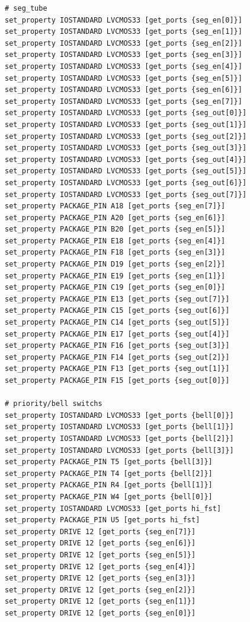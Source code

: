 \documentclass[onecolumn, oneside, ctexart]{SUSTechHomework}
\begin{document}
\begin{lstlisting}
# seg_tube
set_property IOSTANDARD LVCMOS33 [get_ports {seg_en[0]}]
set_property IOSTANDARD LVCMOS33 [get_ports {seg_en[1]}]
set_property IOSTANDARD LVCMOS33 [get_ports {seg_en[2]}]
set_property IOSTANDARD LVCMOS33 [get_ports {seg_en[3]}]
set_property IOSTANDARD LVCMOS33 [get_ports {seg_en[4]}]
set_property IOSTANDARD LVCMOS33 [get_ports {seg_en[5]}]
set_property IOSTANDARD LVCMOS33 [get_ports {seg_en[6]}]
set_property IOSTANDARD LVCMOS33 [get_ports {seg_en[7]}]
set_property IOSTANDARD LVCMOS33 [get_ports {seg_out[0]}]
set_property IOSTANDARD LVCMOS33 [get_ports {seg_out[1]}]
set_property IOSTANDARD LVCMOS33 [get_ports {seg_out[2]}]
set_property IOSTANDARD LVCMOS33 [get_ports {seg_out[3]}]
set_property IOSTANDARD LVCMOS33 [get_ports {seg_out[4]}]
set_property IOSTANDARD LVCMOS33 [get_ports {seg_out[5]}]
set_property IOSTANDARD LVCMOS33 [get_ports {seg_out[6]}]
set_property IOSTANDARD LVCMOS33 [get_ports {seg_out[7]}]
set_property PACKAGE_PIN A18 [get_ports {seg_en[7]}]
set_property PACKAGE_PIN A20 [get_ports {seg_en[6]}]
set_property PACKAGE_PIN B20 [get_ports {seg_en[5]}]
set_property PACKAGE_PIN E18 [get_ports {seg_en[4]}]
set_property PACKAGE_PIN F18 [get_ports {seg_en[3]}]
set_property PACKAGE_PIN D19 [get_ports {seg_en[2]}]
set_property PACKAGE_PIN E19 [get_ports {seg_en[1]}]
set_property PACKAGE_PIN C19 [get_ports {seg_en[0]}]
set_property PACKAGE_PIN E13 [get_ports {seg_out[7]}]
set_property PACKAGE_PIN C15 [get_ports {seg_out[6]}]
set_property PACKAGE_PIN C14 [get_ports {seg_out[5]}]
set_property PACKAGE_PIN E17 [get_ports {seg_out[4]}]
set_property PACKAGE_PIN F16 [get_ports {seg_out[3]}]
set_property PACKAGE_PIN F14 [get_ports {seg_out[2]}]
set_property PACKAGE_PIN F13 [get_ports {seg_out[1]}]
set_property PACKAGE_PIN F15 [get_ports {seg_out[0]}]

# priority/bell switchs
set_property IOSTANDARD LVCMOS33 [get_ports {bell[0]}]
set_property IOSTANDARD LVCMOS33 [get_ports {bell[1]}]
set_property IOSTANDARD LVCMOS33 [get_ports {bell[2]}]
set_property IOSTANDARD LVCMOS33 [get_ports {bell[3]}]
set_property PACKAGE_PIN T5 [get_ports {bell[3]}]
set_property PACKAGE_PIN T4 [get_ports {bell[2]}]
set_property PACKAGE_PIN R4 [get_ports {bell[1]}]
set_property PACKAGE_PIN W4 [get_ports {bell[0]}]
set_property IOSTANDARD LVCMOS33 [get_ports hi_fst]
set_property PACKAGE_PIN U5 [get_ports hi_fst]
set_property DRIVE 12 [get_ports {seg_en[7]}]
set_property DRIVE 12 [get_ports {seg_en[6]}]
set_property DRIVE 12 [get_ports {seg_en[5]}]
set_property DRIVE 12 [get_ports {seg_en[4]}]
set_property DRIVE 12 [get_ports {seg_en[3]}]
set_property DRIVE 12 [get_ports {seg_en[2]}]
set_property DRIVE 12 [get_ports {seg_en[1]}]
set_property DRIVE 12 [get_ports {seg_en[0]}]
\end{lstlisting}
\end{document}

